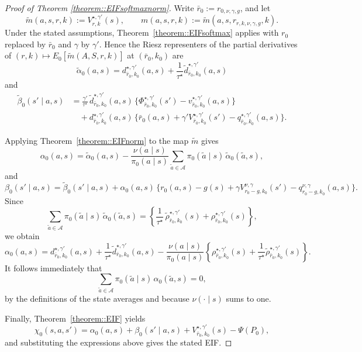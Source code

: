 \documentclass[11pt]{article}
\theoremstyle{plain}
\begin{document}
\begin{proof}[Proof of Theorem \ref{theorem::EIFsoftmaxnorm}]
Write \(\bar r_0 := r_{0,\nu,\gamma,g}\), and let
\[
\tilde m(a,s,r,k) := V_{r,k}^{\star,\gamma'}(s),
\qquad
m(a,s,r,k) := \tilde m(a,s,r_{r,k,\nu,\gamma,g},k).
\]
Under the stated assumptions, Theorem~\ref{theorem::EIFsoftmax} applies with
\(r_0\) replaced by \(\bar r_0\) and \(\gamma\) by \(\gamma'\). Hence the
Riesz representers of the partial derivatives of
\((r,k) \mapsto E_0[\tilde m(A,S,r,k)]\) at \((\bar r_0,k_0)\) are
\[
\tilde\alpha_0(a,s)
=d_{\bar r_0,k_0}^{\star,\gamma'}(a,s)
+\frac{1}{\tau^\star}\widetilde d_{\bar r_0,k_0}^{\star,\gamma'}(a,s)
\]
and
\[
\begin{aligned}
\tilde\beta_0(s'\mid a,s)
&= \frac{\gamma'}{\tau^\star}\,
\widetilde d_{\bar r_0,k_0}^{\star,\gamma'}(a,s)\,
\bigl\{\Phi_{\bar r_0,k_0}^{\star,\gamma'}(s')
- v_{\bar r_0,k_0}^{\star,\gamma'}(a,s)\bigr\} \\
&\quad + d_{\bar r_0,k_0}^{\star,\gamma'}(a,s)\,
\bigl\{\bar r_0(a,s) + \gamma' V_{\bar r_0,k_0}^{\star,\gamma'}(s')
- q_{\bar r_0,k_0}^{\star,\gamma'}(a,s)\bigr\}.
\end{aligned}
\]

Applying Theorem~\ref{theorem::EIFnorm} to the map \(\tilde m\) gives
\[
\alpha_0(a,s)
= \tilde\alpha_0(a,s)
- \frac{\nu(a\mid s)}{\pi_0(a\mid s)}
\sum_{\tilde a \in \mathcal{A}} \pi_0(\tilde a\mid s)\,
\tilde\alpha_0(\tilde a,s),
\]
and
\[
\beta_0(s'\mid a,s)
= \tilde\beta_0(s'\mid a,s)
+ \alpha_0(a,s)\,
\bigl\{r_0(a,s) - g(s) + \gamma V_{r_0-g,k_0}^{\nu,\gamma}(s')
- q_{r_0-g,k_0}^{\nu,\gamma}(a,s)\bigr\}.
\]
Since
\[
\sum_{\tilde a \in \mathcal{A}} \pi_0(\tilde a\mid s)\,\tilde\alpha_0(\tilde a,s)
= \left\{\frac{1}{\tau^\star}\,\widetilde\rho_{\bar r_0,k_0}^{\star,\gamma'}(s)
+ \rho_{\bar r_0,k_0}^{\star,\gamma'}(s)\right\},
\]
we obtain
\[
\alpha_0(a,s)
=d_{\bar r_0,k_0}^{\star,\gamma'}(a,s)
+\frac{1}{\tau^\star}\widetilde d_{\bar r_0,k_0}^{\star,\gamma'}(a,s)
-\frac{\nu(a\mid s)}{\pi_0(a\mid s)}
\left\{\rho_{\bar r_0,k_0}^{\star,\gamma'}(s)
+\frac{1}{\tau^\star}\widetilde\rho_{\bar r_0,k_0}^{\star,\gamma'}(s)\right\}.
\]
It follows immediately that
\[
\sum_{\tilde a \in \mathcal{A}} \pi_0(\tilde a\mid s)\,\alpha_0(\tilde a,s) = 0,
\]
by the definitions of the state averages and because
\(\nu(\cdot\mid s)\) sums to one.

Finally, Theorem~\ref{theorem::EIF} yields
\[
\chi_0(s,a,s')
= \alpha_0(a,s) + \beta_0(s'\mid a,s)
+ V_{\bar r_0,k_0}^{\star,\gamma'}(s) - \Psi(P_0),
\]
and substituting the expressions above gives the stated EIF.
\end{proof}
\end{document}
